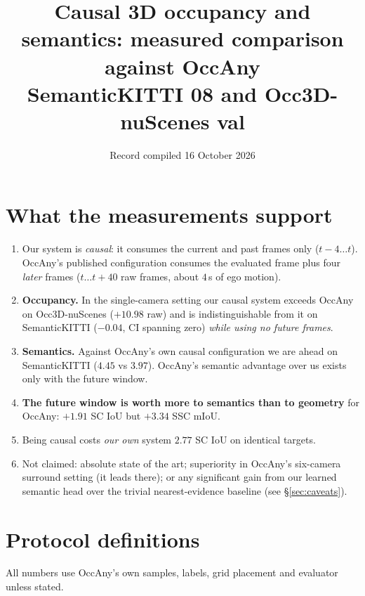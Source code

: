 \documentclass[11pt,a4paper]{article}
\title{Causal 3D occupancy and semantics: measured comparison against OccAny\\[2pt]
\large SemanticKITTI 08 and Occ3D-nuScenes val}
\author{}
\date{Record compiled 16 October 2026}
\begin{document}
\maketitle

\section{What the measurements support}

\begin{enumerate}
  \item Our system is \emph{causal}: it consumes the current and past frames only ($t{-}4\ldots t$).
        OccAny's published configuration consumes the evaluated frame plus four \emph{later} frames
        ($t\ldots t{+}40$ raw frames, about $4$\,s of ego motion).
  \item \textbf{Occupancy.} In the single-camera setting our causal system exceeds OccAny on
        Occ3D-nuScenes ($+10.98$ raw) and is indistinguishable from it on SemanticKITTI
        ($-0.04$, CI spanning zero) \emph{while using no future frames}.
  \item \textbf{Semantics.} Against OccAny's own causal configuration we are ahead on SemanticKITTI
        ($4.45$ vs $3.97$). OccAny's semantic advantage over us exists only with the future window.
  \item \textbf{The future window is worth more to semantics than to geometry} for OccAny:
        $+1.91$ SC IoU but $+3.34$ SSC mIoU.
  \item Being causal costs \emph{our own} system $2.77$ SC IoU on identical targets.
  \item Not claimed: absolute state of the art; superiority in OccAny's six-camera surround setting
        (it leads there); or any significant gain from our learned semantic head over the trivial
        nearest-evidence baseline (see \S\ref{sec:caveats}).
\end{enumerate}

\section{Protocol definitions}

All numbers use OccAny's own samples, labels, grid placement and evaluator unless stated.
\end{document}
